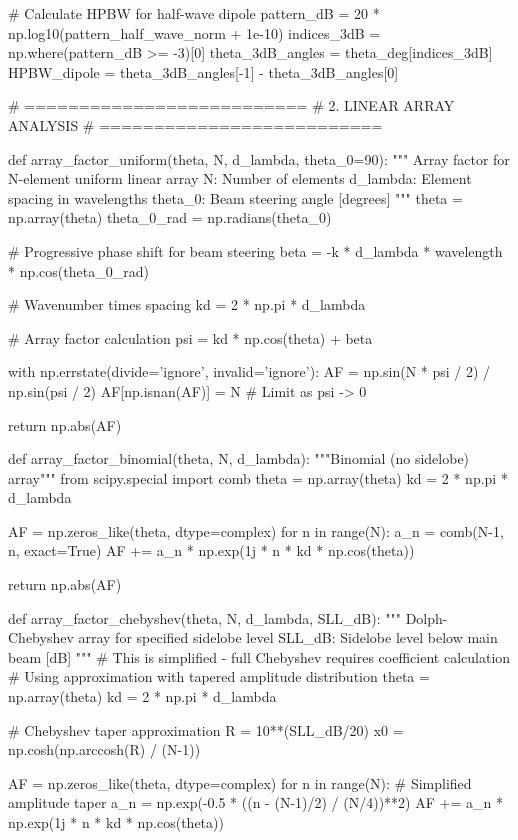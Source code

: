 \documentclass[a4paper, 11pt]{article}
\begin{document}
\begin{pycode}
# Calculate HPBW for half-wave dipole
pattern_dB = 20 * np.log10(pattern_half_wave_norm + 1e-10)
indices_3dB = np.where(pattern_dB >= -3)[0]
theta_3dB_angles = theta_deg[indices_3dB]
HPBW_dipole = theta_3dB_angles[-1] - theta_3dB_angles[0]

# ==========================
# 2. LINEAR ARRAY ANALYSIS
# ==========================

def array_factor_uniform(theta, N, d_lambda, theta_0=90):
    """
    Array factor for N-element uniform linear array
    N: Number of elements
    d_lambda: Element spacing in wavelengths
    theta_0: Beam steering angle [degrees]
    """
    theta = np.array(theta)
    theta_0_rad = np.radians(theta_0)

    # Progressive phase shift for beam steering
    beta = -k * d_lambda * wavelength * np.cos(theta_0_rad)

    # Wavenumber times spacing
    kd = 2 * np.pi * d_lambda

    # Array factor calculation
    psi = kd * np.cos(theta) + beta

    with np.errstate(divide='ignore', invalid='ignore'):
        AF = np.sin(N * psi / 2) / np.sin(psi / 2)
        AF[np.isnan(AF)] = N  # Limit as psi -> 0

    return np.abs(AF)

def array_factor_binomial(theta, N, d_lambda):
    """Binomial (no sidelobe) array"""
    from scipy.special import comb
    theta = np.array(theta)
    kd = 2 * np.pi * d_lambda

    AF = np.zeros_like(theta, dtype=complex)
    for n in range(N):
        a_n = comb(N-1, n, exact=True)
        AF += a_n * np.exp(1j * n * kd * np.cos(theta))

    return np.abs(AF)

def array_factor_chebyshev(theta, N, d_lambda, SLL_dB):
    """
    Dolph-Chebyshev array for specified sidelobe level
    SLL_dB: Sidelobe level below main beam [dB]
    """
    # This is simplified - full Chebyshev requires coefficient calculation
    # Using approximation with tapered amplitude distribution
    theta = np.array(theta)
    kd = 2 * np.pi * d_lambda

    # Chebyshev taper approximation
    R = 10**(SLL_dB/20)
    x0 = np.cosh(np.arccosh(R) / (N-1))

    AF = np.zeros_like(theta, dtype=complex)
    for n in range(N):
        # Simplified amplitude taper
        a_n = np.exp(-0.5 * ((n - (N-1)/2) / (N/4))**2)
        AF += a_n * np.exp(1j * n * kd * np.cos(theta))


\end{pycode}
\end{document}
